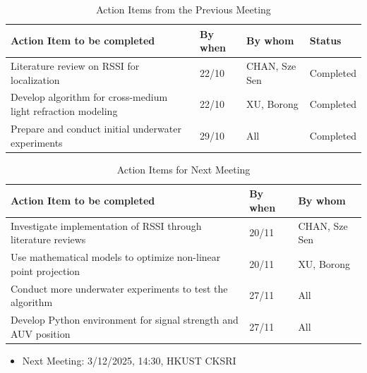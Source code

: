 \documentclass[11pt]{article}
\begin{document}
    \begin{longtable}[c]{|l|l|l|l|}
        \caption{Action Items from the Previous Meeting}\\
        \hline
        \textbf{Action Item to be completed} & \textbf{By when} & \textbf{By whom} & \textbf{Status} \\
        \hline
        \endhead
        Literature review on RSSI for localization & 22/10 & CHAN, Sze Sen & Completed \\
        \hline
        Develop algorithm for cross-medium light refraction modeling & 22/10 & XU, Borong & Completed \\
        \hline
        Prepare and conduct initial underwater experiments & 29/10 & All & Completed \\
        \hline
    \end{longtable}
    \begin{longtable}[c]{|l|l|l|}
        \caption{Action Items for Next Meeting}\\
        \hline
        \textbf{Action Item to be completed} & \textbf{By when} & \textbf{By whom} \\
        \hline
        \endhead
        Investigate implementation of RSSI through literature reviews & 20/11 & CHAN, Sze Sen \\
        \hline
        Use mathematical models to optimize non-linear point projection & 20/11 & XU, Borong \\
        \hline
        Conduct more underwater experiments to test the algorithm & 27/11 & All \\
        \hline
        Develop Python environment for signal strength and AUV position & 27/11 & All \\
        \hline
    \end{longtable}
    \begin{itemize}
    \item Next Meeting: 3/12/2025, 14:30, HKUST CKSRI
    \end{itemize}
    \newpage
\end{document}
